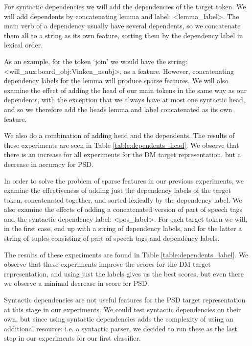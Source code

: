 For syntactic dependencies we will add the dependencies of the target token. We will add dependents by concatenating lemma and label: <lemma\_label>. The main verb of a dependency usually have several dependents, so we concatenate them all to a string as its own feature, sorting them by the dependency label in lexical order. 

As an example, for the token `join' we would have the string: <will\_aux:board\_obj:Vinken\_nsubj>, as a feature. However, concatenating dependency labels for the lemma will produce sparse features. We will also examine the effect of adding the head of our main tokens in the same way as our dependents, with the exception that we always have at most one syntactic head, and so we therefore add the heads lemma and label concatenated as its own feature. 

We also do a combination of adding head and the dependents. The results of these experiments are seen in Table \ref{table:dependents_head}. We observe that there is an increase for all experiments for the DM target representation, but a decrease in accuracy for PSD.

In order to solve the problem of sparse features in our previous experiments, we examine the effectiveness of adding just the dependency labels of the target token, concatenated together, and sorted lexically by the dependency label. We also examine the effects of adding a concatenated version of part of speech tags and the syntactic dependency label: <pos\_label>. For each target token we will, in the first case, end up with a string of dependency labels, and for the latter a string of tuples consisting of part of speech tags and dependency labels.

The results of these experiments are found in Table \ref{table:dependents_label}. We observe that these experiments improve the scores for the DM target representation, and using just the labels gives us the best scores, but even there we observe a minimal decrease in score for PSD.


Syntactic dependencies are not useful features for the PSD target representation at this stage in our experiments. We could test syntactic dependencies on their own, but since using syntactic dependencies adds the complexity of using an additional resource: i.e. a syntactic parser, we decided to run these as the last step in our experiments for our first classifier.


